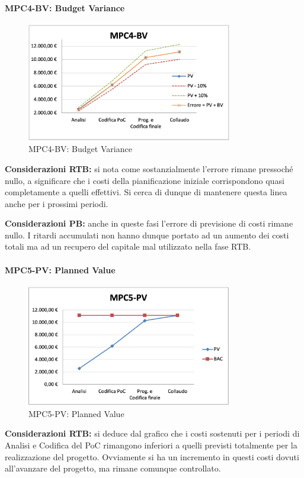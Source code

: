 \paragraph{MPC4-BV: Budget Variance}
\begin{figure}[h!] 
    \centering
    \includegraphics[width=0.8\textwidth]{images/MPC4-BV.png}
    \caption{MPC4-BV: Budget Variance}
\end{figure}
\noindent \textbf{Considerazioni RTB:} si nota come sostanzialmente l'errore rimane pressoché nullo, a significare che i costi della pianificazione iniziale corrispondono quasi completamente a quelli effettivi. Si cerca di dunque di mantenere questa linea anche per i prossimi periodi.

\vspace{0.5cm}
\noindent \textbf{Considerazioni PB:} anche in queste fasi l'errore di previsione di costi rimane nullo. I ritardi accumulati non hanno dunque portato ad un aumento dei costi totali ma ad un recupero del capitale mal utilizzato nella fase RTB.

\paragraph{MPC5-PV: Planned Value}
\begin{figure}[h!]
    \centering
    \includegraphics[width=0.8\textwidth]{images/MPC5-PV.png}
    \caption{MPC5-PV: Planned Value}
\end{figure}
\noindent \textbf{Considerazioni RTB:} si deduce dal grafico che i costi sostenuti per i periodi di Analisi e Codifica del PoC rimangono inferiori a quelli previsti totalmente per la realizzazione del progetto. Ovviamente si ha un incremento in questi costi dovuti all'avanzare del progetto, ma rimane comunque controllato.

